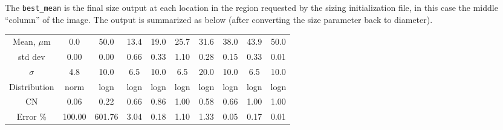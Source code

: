 The \texttt{best\_mean} is the final size output at each location in the region requested by the sizing initialization file, in this case the middle ``column'' of the image.  The output is summarized as below (after converting the size parameter back to diameter).


\begin{tabular}{cccccccccc}
\\ \hline
Mean, $\mu$m  & 0.0 & 50.0 & 13.4 & 19.0 & 25.7 & 31.6 & 38.0 & 43.9 & 50.0 \\ 
std dev  & 0.00 & 0.00 & 0.66 & 0.33 & 1.10 & 0.28 & 0.15 & 0.33 & 0.01 \\ 
 $\sigma$  & 4.8 & 10.0 & 6.5 & 10.0 & 6.5 & 20.0 & 10.0 & 6.5 & 10.0 \\ 
Distribution & norm & logn & logn & logn & logn & logn & logn & logn & logn \\ 
 CN  & 0.06 & 0.22 & 0.66 & 0.86 & 1.00 & 0.58 & 0.66 & 1.00 & 1.00 \\ 
Error \%  & 100.00 & 601.76 & 3.04 & 0.18 & 1.10 & 1.33 & 0.05 & 0.17 & 0.01 \\ \hline 
\end{tabular}
